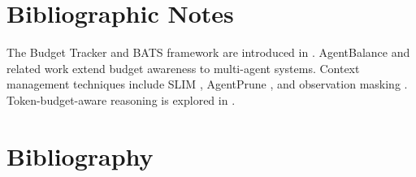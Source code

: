 \documentclass[11pt]{book}
\begin{document}
\section*{Bibliographic Notes}

The Budget Tracker and BATS framework are introduced in \cite{bats2025}. AgentBalance \cite{agentbalance2025} and related work extend budget awareness to multi-agent systems. Context management techniques include SLIM \cite{slim2025}, AgentPrune \cite{agentprune2025}, and observation masking \cite{observationmasking2025}. Token-budget-aware reasoning is explored in \cite{tokenbudget2025}.

\section*{Bibliography}
\end{document}

